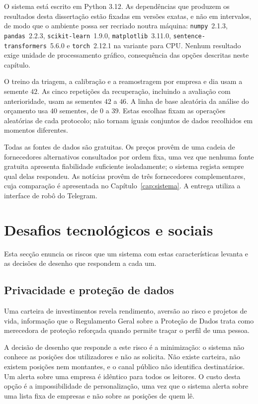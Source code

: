 O sistema está escrito em Python 3.12. As dependências que produzem os resultados desta dissertação
estão fixadas em versões exatas, e não em intervalos, de modo que o ambiente possa ser recriado
noutra máquina: \texttt{numpy}~2.1.3, \texttt{pandas}~2.2.3, \texttt{scikit-learn}~1.9.0,
\texttt{matplotlib}~3.11.0, \texttt{sentence-transformers}~5.6.0 e \texttt{torch}~2.12.1 na variante
para CPU. Nenhum resultado exige unidade de processamento gráfico, consequência das opções
descritas neste capítulo.

O treino da triagem, a calibração e a reamostragem por empresa e dia usam a semente $42$.
As cinco repetições da recuperação, incluindo a avaliação com anterioridade, usam as sementes
$42$ a $46$. A linha de base aleatória da análise do orçamento usa $40$ sementes, de $0$ a $39$.
Estas escolhas fixam as operações aleatórias de cada protocolo; não tornam iguais conjuntos
de dados recolhidos em momentos diferentes.

Todas as fontes de dados são gratuitas. Os preços provêm de uma cadeia de fornecedores alternativos
consultados por ordem fixa, uma vez que nenhuma fonte gratuita apresenta fiabilidade suficiente
isoladamente; o sistema regista sempre qual delas respondeu. As notícias provêm de três fornecedores
complementares, cuja comparação é apresentada no Capítulo~\ref{cap:sistema}. A entrega utiliza a
interface de robô do Telegram.

\section{Desafios tecnológicos e sociais}
\label{sec:met_desafios}

Esta secção enuncia os riscos que um sistema com estas características levanta e as decisões de
desenho que respondem a cada um.

\subsection{Privacidade e proteção de dados}
\label{sec:met_privacidade}

Uma carteira de investimentos revela rendimento, aversão ao risco e projetos de vida, informação
que o Regulamento Geral sobre a Proteção de Dados trata como merecedora de proteção reforçada
quando permite traçar o perfil de uma pessoa.

A decisão de desenho que responde a este risco é a minimização: o sistema não conhece as posições
dos utilizadores e não as solicita. Não existe carteira, não existem posições nem montantes, e o
canal público não identifica destinatários. Um alerta sobre uma empresa é idêntico para todos os
leitores. O custo desta opção é a impossibilidade de personalização, uma vez que o sistema alerta
sobre uma lista fixa de empresas e não sobre as posições de quem lê.

